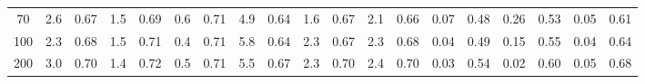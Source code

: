 \documentclass[10pt, letterpaper]{IEEEtran}
\begin{document}
\begin{CJK}{UTF8}{ipxm}
\begin{table*}[t]
\begin{center}
\begin{tabular}{c|cccccc|cccccc|cccccc}
      70 & 2.6 & \hspace{-0.25cm} 0.67 & \hspace{-0.25cm} 1.5 & \hspace{-0.25cm} 0.69 & \hspace{-0.25cm} 0.6 & \hspace{-0.25cm} 0.71 & 4.9 & \hspace{-0.25cm} 0.64 & \hspace{-0.25cm} 1.6 & \hspace{-0.25cm} 0.67 & \hspace{-0.25cm} 2.1 & \hspace{-0.25cm} 0.66 & 0.07 & \hspace{-0.25cm} 0.48 & \hspace{-0.25cm} 0.26 & \hspace{-0.25cm} 0.53 & \hspace{-0.25cm} 0.05 & \hspace{-0.25cm} 0.61 \\
      100 & 2.3 & \hspace{-0.25cm} 0.68 & \hspace{-0.25cm} 1.5 & \hspace{-0.25cm} 0.71 & \hspace{-0.25cm} 0.4 & \hspace{-0.25cm} 0.71 & 5.8 & \hspace{-0.25cm} 0.64 & \hspace{-0.25cm} 2.3 & \hspace{-0.25cm} 0.67 & \hspace{-0.25cm} 2.3 & \hspace{-0.25cm} 0.68 & 0.04 & \hspace{-0.25cm} 0.49 & \hspace{-0.25cm} 0.15 & \hspace{-0.25cm} 0.55 & \hspace{-0.25cm} 0.04 & \hspace{-0.25cm} 0.64 \\
      200 & 3.0 & \hspace{-0.25cm} 0.70 & \hspace{-0.25cm} 1.4 & \hspace{-0.25cm} 0.72 & \hspace{-0.25cm} 0.5 & \hspace{-0.25cm} 0.71 & 5.5 & \hspace{-0.25cm} 0.67 & \hspace{-0.25cm} 2.3 & \hspace{-0.25cm} 0.70 & \hspace{-0.25cm} 2.4 & \hspace{-0.25cm} 0.70 & 0.03 & \hspace{-0.25cm} 0.54 & \hspace{-0.25cm} 0.02 & \hspace{-0.25cm} 0.60 & \hspace{-0.25cm} 0.05 & \hspace{-0.25cm} 0.68 \\

\end{tabular}
\end{center}
\end{table*}
\end{CJK}
\end{document}
